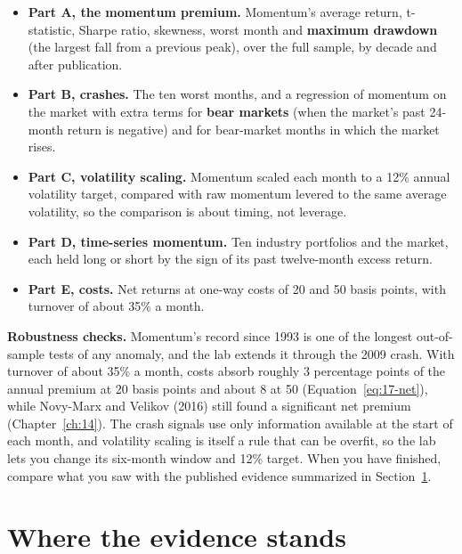 \begin{itemize}
  \item \textbf{Part A, the momentum premium.} Momentum's average return, t-statistic, Sharpe ratio, skewness, worst month and \textbf{maximum drawdown} (the largest fall from a previous peak), over the full sample, by decade and after publication.
  \item \textbf{Part B, crashes.} The ten worst months, and a regression of momentum on the market with extra terms for \textbf{bear markets} (when the market's past 24-month return is negative) and for bear-market months in which the market rises.
  \item \textbf{Part C, volatility scaling.} Momentum scaled each month to a 12\% annual volatility target, compared with raw momentum levered to the same average volatility, so the comparison is about timing, not leverage.
  \item \textbf{Part D, time-series momentum.} Ten industry portfolios and the market, each held long or short by the sign of its past twelve-month excess return.
  \item \textbf{Part E, costs.} Net returns at one-way costs of 20 and 50 basis points, with turnover of about 35\% a month.
\end{itemize}

\label{sec:05-stress}
\textbf{Robustness checks.} Momentum's record since 1993 is one of the longest out-of-sample tests of any anomaly, and the lab extends it through the 2009 crash. With turnover of about 35\% a month, costs absorb roughly 3 percentage points of the annual premium at 20 basis points and about 8 at 50 (Equation~\eqref{eq:17-net}), while Novy-Marx and Velikov (2016) still found a significant net premium (Chapter~\ref{ch:14}). The crash signals use only information available at the start of each month, and volatility scaling is itself a rule that can be overfit, so the lab lets you change its six-month window and 12\% target. When you have finished, compare what you saw with the published evidence summarized in Section~\ref{sec:05-verdict}.

\section{Where the evidence stands}
\label{sec:05-verdict}

